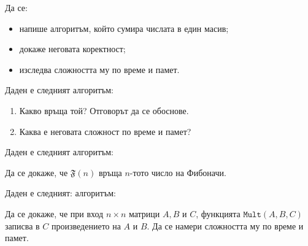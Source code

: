 \begin{problem}
Да се:
\begin{itemize}
    \item напише алгоритъм, който сумира числата в един масив;
    \item докаже неговата коректност;
    \item изследва сложността му по време и памет.
\end{itemize}
\end{problem}

\begin{problem}
Даден е следният алгоритъм:


\begin{enumerate}
    \item Какво връща той? Отговорът да се обоснове.
    \item Каква е неговата сложност по време и памет?
\end{enumerate}
\end{problem}

\newpage

\begin{problem}
Даден е следният алгоритъм:


Да се докаже, че $\mathfrak{F}(n)$ връща $n$-тото число на Фибоначи.
\end{problem}

\begin{problem}
Даден е следният: алгоритъм:


Да се докаже, че при вход $n \times n$ матрици $A, B$ и $C$, функцията $\mathtt{Mult}(A, B, C)$ записва в $C$ произведението на $A$ и $B$.
Да се намери сложността му по време и памет.
\end{problem}
